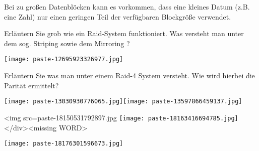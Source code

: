\documentclass{article}
\begin{document}
\begin{tcolorbox}[colback=white!10!white,colframe=lightgray!75!black,
  savelowerto=\jobname_ex.tex]

\begin{center}
Bei zu großen Datenblöcken kann es vorkommen, dass eine kleines Datum (z.B. eine Zahl) nur einen geringen Teil der verfügbaren Blockgröße verwendet.

\end{center}

\tcblower

\justifying

\end{tcolorbox}
\begin{tcolorbox}[colback=white!10!white,colframe=lightgray!75!black,
  savelowerto=\jobname_ex.tex]

\begin{center}
 Erläutern Sie grob wie ein Raid-System funktioniert. Was versteht man unter dem sog. 
Striping
sowie dem 
Mirroring
? 

\end{center}

\tcblower

\justifying
\texttt{[image: paste-12695923326977.jpg]}
\end{tcolorbox}
\begin{tcolorbox}[colback=white!10!white,colframe=lightgray!75!black,
  savelowerto=\jobname_ex.tex]

\begin{center}
 Erläutern Sie was man unter einem 
Raid-4 System
versteht. Wie wird hierbei die Parität ermittelt? 

\end{center}

\tcblower

\justifying
\texttt{[image: paste-13030930776065.jpg]}\texttt{[image: paste-13597866459137.jpg]}
\end{tcolorbox}
\begin{tcolorbox}[colback=white!10!white,colframe=lightgray!75!black,
  savelowerto=\jobname_ex.tex]

\begin{center}
 <img src=paste-18150531792897.jpg 
\texttt{[image: paste-18163416694785.jpg]} </div><missing WORD>

\end{center}

\tcblower

\justifying
\texttt{[image: paste-18176301596673.jpg]}
\end{tcolorbox}
\end{document}
